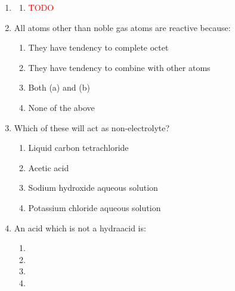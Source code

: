 \begin{enumerate}[label=(\roman*)]
    \item 

        \begin{multicols}{2}
        \begin{enumerate}[label=(\alph*)]
            \setlength\itemsep{0em}
            \item \textcolor{red}{TODO} 
        \end{enumerate}
        \end{multicols}

    \item All atoms other than noble gas atoms are reactive because:

        \begin{enumerate}[label=(\alph*)]
            \setlength\itemsep{0em}
            \item They have tendency to complete octet
            \item They have tendency to combine with other atoms
            \item Both (a) and (b)
            \item None of the above
        \end{enumerate}

    \item Which of these will act as non-electrolyte?

        \begin{enumerate}[label=(\alph*)]
            \setlength\itemsep{0em}
            \item Liquid carbon tetrachloride
            \item Acetic acid
            \item Sodium hydroxide aqueous solution
            \item Potassium chloride aqueous solution
        \end{enumerate}

    \item An acid which is not a hydraacid is:

        \begin{multicols}{2}
        \begin{enumerate}[label=(\alph*)]
            \setlength\itemsep{0em}
            \item {}
            \item {}
            \item {}
            \item {}
        \end{enumerate}
        \end{multicols}


\end{enumerate}
